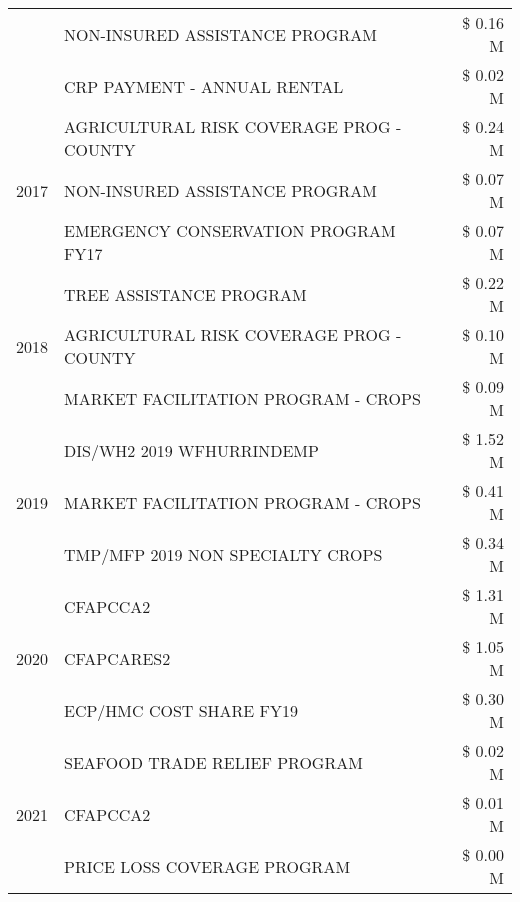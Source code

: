 \begin{tabular}{llr}
 & NON-INSURED ASSISTANCE PROGRAM & \$ 0.16 M \\
 & CRP PAYMENT - ANNUAL RENTAL & \$ 0.02 M \\
\cline{1-3}
\multirow[t]{3}{*}{2017} & AGRICULTURAL RISK COVERAGE PROG - COUNTY & \$ 0.24 M \\
 & NON-INSURED ASSISTANCE PROGRAM & \$ 0.07 M \\
 & EMERGENCY CONSERVATION PROGRAM FY17 & \$ 0.07 M \\
\cline{1-3}
\multirow[t]{3}{*}{2018} & TREE ASSISTANCE PROGRAM & \$ 0.22 M \\
 & AGRICULTURAL RISK COVERAGE PROG - COUNTY & \$ 0.10 M \\
 & MARKET FACILITATION PROGRAM - CROPS & \$ 0.09 M \\
\cline{1-3}
\multirow[t]{3}{*}{2019} & DIS/WH2 2019 WFHURRINDEMP & \$ 1.52 M \\
 & MARKET FACILITATION PROGRAM - CROPS & \$ 0.41 M \\
 & TMP/MFP 2019 NON SPECIALTY CROPS & \$ 0.34 M \\
\cline{1-3}
\multirow[t]{3}{*}{2020} & CFAPCCA2 & \$ 1.31 M \\
 & CFAPCARES2 & \$ 1.05 M \\
 & ECP/HMC COST SHARE FY19 & \$ 0.30 M \\
\cline{1-3}
\multirow[t]{3}{*}{2021} & SEAFOOD TRADE RELIEF PROGRAM & \$ 0.02 M \\
 & CFAPCCA2 & \$ 0.01 M \\
 & PRICE LOSS COVERAGE PROGRAM & \$ 0.00 M \\
\cline{1-3}
\bottomrule
\end{tabular}
